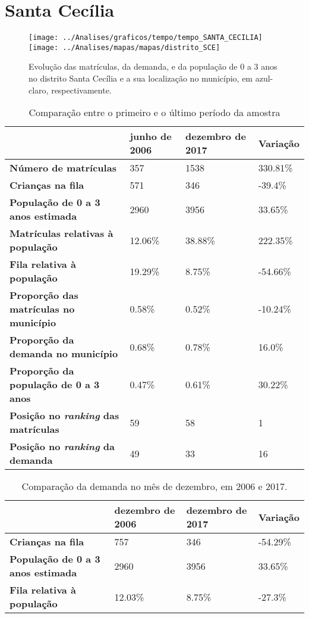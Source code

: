 \section{Santa Cecília}
\begin{figure}[H]
\centering
\texttt{[image: ../Analises/graficos/tempo/tempo\_SANTA\_CECILIA]}
\texttt{[image: ../Analises/mapas/mapas/distrito\_SCE]}
\caption{Evolução das matrículas, da demanda, e da população de 0 a 3 anos no distrito Santa Cecília e a sua localização no município, em azul-claro, respectivamente.}
\end{figure}
\begin{table}[H]
\begin{tabular}{l|l|l|l}
\textbf{}                                      & \textbf{junho de 2006}       & \textbf{dezembro de 2017}    & \textbf{Variação} \\ \hline
\textbf{Número de matrículas}                  & 357 & 1538 & 330.81\% \\ \hline
\textbf{Crianças na fila}                      & 571 & 346 & -39.4\% \\ \hline
\textbf{População de 0 a 3 anos estimada}      & 2960 & 3956 & 33.65\% \\ \hline
\textbf{Matrículas relativas à população}      & 12.06\% & 38.88\% & 222.35\% \\ \hline
\textbf{Fila relativa à população}             & 19.29\% & 8.75\% & -54.66\% \\ \hline
\textbf{Proporção das matrículas no município} & 0.58\% & 0.52\% & -10.24\% \\ \hline
\textbf{Proporção da demanda no município}     & 0.68\% & 0.78\% & 16.0\% \\ \hline
\textbf{Proporção da população de 0 a 3 anos}  & 0.47\% & 0.61\% & 30.22\% \\ \hline
\textbf{Posição no \textit{ranking} das matrículas}     & 59 & 58 & 1 \\ \hline
\textbf{Posição no \textit{ranking} da demanda}         & 49 & 33 & 16 \\ 
\end{tabular}
\caption{Comparação entre o primeiro e o último período da amostra}
\end{table}
\begin{table}[H]
\begin{tabular}{l|l|l|l}
\textbf{}                                 & \textbf{dezembro de 2006} & \textbf{dezembro de 2017} & \textbf{Variação} \\ \hline
\textbf{Crianças na fila}                      & 757 & 346 & -54.29\% \\ \hline
\textbf{População de 0 a 3 anos estimada}      & 2960 & 3956 & 33.65\% \\ \hline
\textbf{Fila relativa à população}             & 12.03\% & 8.75\% & -27.3\% \\
\end{tabular}
\caption{Comparação da demanda no mês de dezembro, em 2006 e 2017.}
\end{table}
